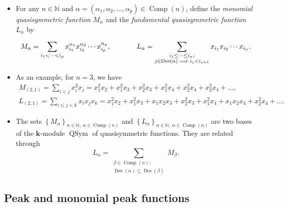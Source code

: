 \documentclass[numbers=enddot,12pt,final,onecolumn,notitlepage]{scrartcl}%
\newcommand{\al}{\alpha}
\newcommand{\NN}{\mathbb{N}} %
\newcommand{\kk}{\mathbf{k}} %
\newcommand{\QSym}{\operatorname{QSym}}
\newcommand{\Des}{\operatorname{Des}}
\newcommand{\Comp}{\operatorname{Comp}}
\newcommand{\defn}[1]{{\color{darkred}\emph{#1}}}
\newcommand{\0}{\phantom{c}}
\let\sumnonlimits\sum
\renewcommand{\sum}{\sumnonlimits\limits}
\begin{document}
\begin{itemize}
\item For any $n \in \NN$ and $\al =(\al_1,\al_2,\dots,\al_p) \in \Comp(n)$, define the \defn{monomial quasisymmetric function} $M_\al$ and the \defn{fundamental quasisymmetric function} $L_\al$ by

\begin{equation*}
\label{eq : M+L}
M_{\al} = \sum\limits_{i_1 < \cdots < i_p} x_{i_1}^{\al_1}x_{i_2}^{\al_2} \cdots x_{i_p}^{\al_p},\;\;\;\;\;\;\qquad L_{\al} = \sum\limits_{\substack{i_1 \leq \cdots \leq i_n;\\j\in \Des(\al) \implies i_j<i_{j+1}}} x_{i_1}x_{i_2} \cdots x_{i_n}.
\end{equation*}

\item As an example, for $n=3$, we have
\begin{gather*}
M_{(2,1)}=\sum_{i<j}x_{i}^{2}x_{j}=x_{1}^{2}x_{2}+x_{1}%
^{2}x_{3}+x_{2}^{2}x_{3}+x_{1}^{2}x_{4}+x_{2}^{2}x_{4}+x_{3}^{2}x_{4}+\dots,\\
L_{(2,1)}=\sum_{i\leq j <k}x_{i}x_{j}x_k=x_{1}^{2}x_{2}+x_{1}%
^{2}x_{3}+x_{1}x_{2}x_3+x_{2}^{2}x_{3}+x_{1}^{2}x_{4}+x_{1}
x_{2}x_{4}+x_{2}^{2}x_{4}+\dots.
\end{gather*}
\item The sets $\left\{M_\al\right\}_{n\in \NN,\ \al\in \Comp(n)}$
and $\left\{L_\al\right\}_{n\in \NN,\ \al\in \Comp(n)}$
are two bases of the $\kk$-module $\QSym$ of quasisymmetric functions.
They are related through
\begin{equation}
\label{eq : LM} L_{\al} = \sum_{{\substack{\beta \in \Comp(n);\\\Des(\alpha) \subseteq \Des(\beta)}}} M_{\beta}.
\end{equation}
\end{itemize}

\subsection{Peak and monomial peak functions}
\end{document}
